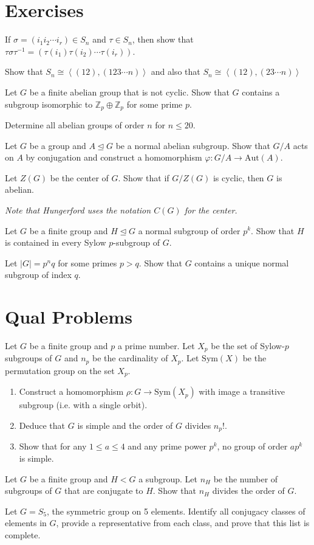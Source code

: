 \hypertarget{exercises}{%
\section{Exercises}\label{exercises}}

If \(\sigma = (i_1 i_2 \cdots i_r) \in S_n\) and \(\tau \in S_n\), then
show that
\(\tau\sigma\tau^{-1} = (\tau(i_1) \tau(i_2) \cdots \tau(i_r))\).

Show that \(S_n \cong \left\langle (12), (123\cdots n)\right\rangle\)
and also that \(S_n \cong \left\langle (12), (23\cdots n)\right\rangle\)

Let \(G\) be a finite abelian group that is not cyclic. Show that \(G\)
contains a subgroup isomorphic to \(\mathbb{Z}_p \oplus \mathbb{Z}_p\)
for some prime \(p\).

Determine all abelian groups of order \(n\) for \(n\leq 20\).

Let \(G\) be a group and \(A \trianglelefteq G\) be a normal abelian
subgroup. Show that \(G/A\) acts on \(A\) by conjugation and construct a
homomorphism \(\varphi: G/A \to \mathrm{Aut}(A)\).

Let \(Z(G)\) be the center of \(G\). Show that if \(G/Z(G)\) is cyclic,
then \(G\) is abelian.

\emph{Note that Hungerford uses the notation \(C(G)\) for the center.}

Let \(G\) be a finite group and \(H \trianglelefteq G\) a normal
subgroup of order \(p^k\). Show that \(H\) is contained in every Sylow
\(p\)-subgroup of \(G\).

Let \(\left| G \right| = p^n q\) for some primes \(p > q\). Show that
\(G\) contains a unique normal subgroup of index \(q\).

\hypertarget{qual-problems}{%
\section{Qual Problems}\label{qual-problems}}

Let \(G\) be a finite group and \(p\) a prime number. Let \(X_p\) be the
set of Sylow-\(p\) subgroups of \(G\) and \(n_p\) be the cardinality of
\(X_p\). Let \(\mathrm{Sym}(X)\) be the permutation group on the set
\(X_p\).

\begin{enumerate}
\item
  Construct a homomorphism \(\rho: G \to \mathrm{Sym}(X_p)\) with image
  a transitive subgroup (i.e. with a single orbit).
\item
  Deduce that \(G\) is simple and the order of \(G\) divides \(n_p!\).
\item
  Show that for any \(1\leq a \leq 4\) and any prime power \(p^k\), no
  group of order \(ap^k\) is simple.
\end{enumerate}

Let \(G\) be a finite group and \(H<G\) a subgroup. Let \(n_H\) be the
number of subgroups of \(G\) that are conjugate to \(H\). Show that
\(n_H\) divides the order of \(G\).

Let \(G=S_5\), the symmetric group on 5 elements. Identify all conjugacy
classes of elements in \(G\), provide a representative from each class,
and prove that this list is complete.
